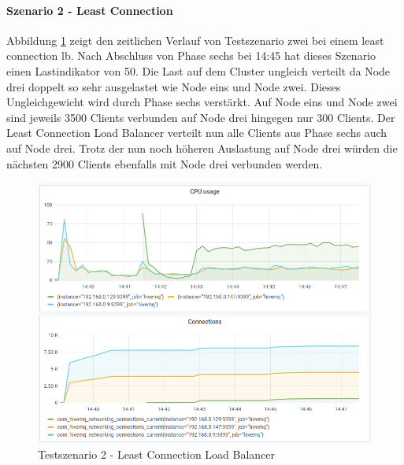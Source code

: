 \paragraph{Szenario 2 - Least Connection}
Abbildung \ref{fig:s2-lc} zeigt den zeitlichen Verlauf von Testszenario zwei bei einem least connection \ac{lb}.
Nach Abschluss von Phase sechs bei 14:45 hat dieses Szenario einen Lastindikator von 50.
Die Last auf dem Cluster ungleich verteilt da Node drei doppelt so sehr ausgelastet wie Node eins und Node zwei. Dieses Ungleichgewicht wird durch Phase sechs verstärkt. Auf Node eins und Node zwei sind jeweils 3500 Clients verbunden auf Node drei hingegen nur 300 Clients. Der Least Connection Load Balancer verteilt nun alle Clients aus Phase sechs auch auf Node drei. Trotz der nun noch höheren Auslastung auf Node drei würden die nächsten 2900 Clients ebenfalls mit Node drei verbunden werden.
\begin{figure}
    \centering
    \includegraphics[scale=0.8]{images/s2_lc.png}
    \caption{Testszenario 2 - Least Connection Load Balancer}
    \label{fig:s2-lc}
\end{figure}

